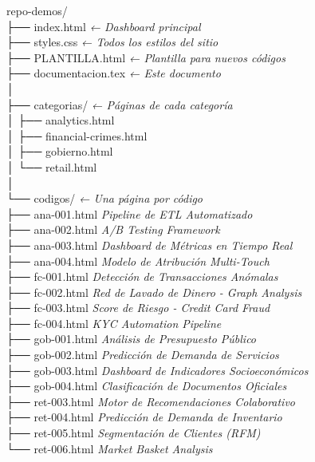 \documentclass[12pt, a4paper]{article}
\begin{document}
\begin{cajaCodigo}
repo-demos/\\
\quad├── index.html             \textit{← Dashboard principal}\\
\quad├── styles.css             \textit{← Todos los estilos del sitio}\\
\quad├── PLANTILLA.html         \textit{← Plantilla para nuevos códigos}\\
\quad├── documentacion.tex      \textit{← Este documento}\\
\quad│\\
\quad├── categorias/            \textit{← Páginas de cada categoría}\\
\quad│   ├── analytics.html\\
\quad│   ├── financial-crimes.html\\
\quad│   ├── gobierno.html\\
\quad│   └── retail.html\\
\quad│\\
\quad└── codigos/               \textit{← Una página por código}\\
\quad    ├── ana-001.html        \textit{Pipeline de ETL Automatizado}\\
\quad    ├── ana-002.html        \textit{A/B Testing Framework}\\
\quad    ├── ana-003.html        \textit{Dashboard de Métricas en Tiempo Real}\\
\quad    ├── ana-004.html        \textit{Modelo de Atribución Multi-Touch}\\
\quad    ├── fc-001.html         \textit{Detección de Transacciones Anómalas}\\
\quad    ├── fc-002.html         \textit{Red de Lavado de Dinero - Graph Analysis}\\
\quad    ├── fc-003.html         \textit{Score de Riesgo - Credit Card Fraud}\\
\quad    ├── fc-004.html         \textit{KYC Automation Pipeline}\\
\quad    ├── gob-001.html        \textit{Análisis de Presupuesto Público}\\
\quad    ├── gob-002.html        \textit{Predicción de Demanda de Servicios}\\
\quad    ├── gob-003.html        \textit{Dashboard de Indicadores Socioeconómicos}\\
\quad    ├── gob-004.html        \textit{Clasificación de Documentos Oficiales}\\
\quad    ├── ret-003.html        \textit{Motor de Recomendaciones Colaborativo}\\
\quad    ├── ret-004.html        \textit{Predicción de Demanda de Inventario}\\
\quad    ├── ret-005.html        \textit{Segmentación de Clientes (RFM)}\\
\quad    └── ret-006.html        \textit{Market Basket Analysis}
\end{cajaCodigo}
\end{document}
